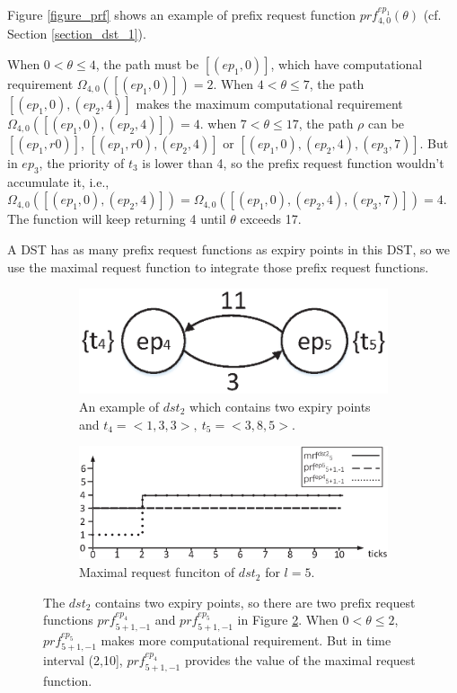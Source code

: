 \documentclass[sigconf]{acmart}
\begin{document}
Figure \ref{figure_prf} shows an example of prefix request function $prf^{ep_1}_{4,0}(\theta)$ (cf. Section \ref{section_dst_1}). 

When $0<\theta\leq4$, the path must be $[(ep_1,0)]$, which have computational requirement $\Omega_{4,0}([(ep_1,0)])=2$. When $4<\theta\leq7$, the path $[(ep_1,0),(ep_2,4)]$ makes the maximum computational requirement $\Omega_{4,0}([(ep_1,0),(ep_2,4)])=4$. when $7<\theta\leq17$, the path $\rho$ can be $[(ep_1,r0)]$, $[(ep_1,r0),(ep_2,4)]$ or $[(ep_1,0),(ep_2,4),(ep_3,7)]$. But in $ep_3$, the priority of $t_3$ is lower than 4, so the prefix request function wouldn't accumulate it, i.e., $\Omega_{4,0}([(ep_1,0),(ep_2,4)])=\Omega_{4,0}([(ep_1,0),(ep_2,4),(ep_3,7)])=4$. The function will keep returning 4 until $\theta$ exceeds 17.

A DST has as many prefix request functions as expiry points in this DST, so we use the maximal request function to integrate those prefix request functions.
\begin{figure}
  \centering
  \begin{subfigure}[t]{3.25in}
    \centering
    \includegraphics[scale=.45]{graphics/figure_dst2.eps}
    \caption{An example of $dst_2$ which contains two expiry points and $t_4=<1,3,3>,\ t_5=<3,8,5>$.}\label{figure_dst2}
  \end{subfigure}
  \quad
  \begin{subfigure}[t]{3.25in}
    \centering
    \includegraphics[scale=.325]{graphics/figure_mrf.eps}
    \caption{Maximal request funciton of $dst_2$ for $l=5$.}\label{figure_mrf}
  \end{subfigure}
  \caption{The $dst_2$ contains two expiry points, so there are two prefix request functions $prf^{ep_4}_{5+1,-1}$ and $prf^{ep_5}_{5+1,-1}$ in Figure \ref{figure_mrf}. When $0<\theta\leq2$, $prf^{ep_5}_{5+1,-1}$ makes more computational requirement. But in time interval (2,10], $prf^{ep_4}_{5+1,-1}$ provides the value of the maximal request function.}\label{figure_dst2_mrf}
\end{figure}
\end{document}
